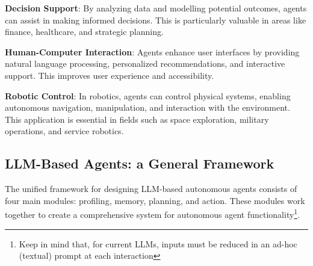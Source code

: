 \textbf{Decision Support}: By analyzing data and modelling potential outcomes, agents can assist in making informed decisions. This is particularly valuable in areas like finance, healthcare, and strategic planning.

\textbf{Human-Computer Interaction}: Agents enhance user interfaces by providing natural language processing, personalized recommendations, and interactive support. This improves user experience and accessibility.

\textbf{Robotic Control}: In robotics, agents can control physical systems, enabling autonomous navigation, manipulation, and interaction with the environment. This application is essential in fields such as space exploration, military operations, and service robotics.


\subsection{LLM-Based Agents: a General Framework}\label{agent modules}
The unified framework for designing LLM-based autonomous agents \cite{Wang_2024} consists of four main modules: profiling, memory, planning, and action. These modules work together to create a comprehensive system for autonomous agent functionality\footnote{Keep in mind that, for current LLMs, inputs must be reduced in an ad-hoc (textual) prompt at each interaction}.

